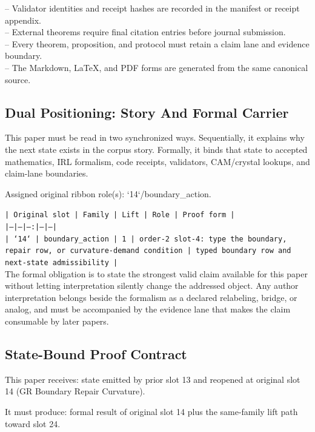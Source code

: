 \documentclass[11pt]{article}
\begin{document}
\noindent{}-- Validator identities and receipt hashes are recorded in the manifest or receipt appendix.\\
\noindent{}-- External theorems require final citation entries before journal submission.\\
\noindent{}-- Every theorem, proposition, and protocol must retain a claim lane and evidence boundary.\\
\noindent{}-- The Markdown, LaTeX, and PDF forms are generated from the same canonical source.\\

\subsection*{Dual Positioning: Story And Formal Carrier}

This paper must be read in two synchronized ways. Sequentially, it explains why
the next state exists in the corpus story. Formally, it binds that state to
accepted mathematics, IRL formalism, code receipts, validators, CAM/crystal
lookups, and claim-lane boundaries.

Assigned original ribbon role(s): `14`/boundary\_action.

\noindent\texttt{| Original slot | Family | Lift | Role | Proof form |}\\
\noindent\texttt{|---|---|---:|---|---|}\\
\noindent\texttt{| `14` | boundary\_action | 1 | order-2 slot-4: type the boundary, repair row, or curvature-demand condition | typed boundary row and next-state admissibility |}\\

The formal obligation is to state the strongest valid claim available for this
paper without letting interpretation silently change the addressed object. Any
author interpretation belongs beside the formalism as a declared relabeling,
bridge, or analog, and must be accompanied by the evidence lane that makes the
claim consumable by later papers.

\subsection*{State-Bound Proof Contract}

This paper receives: state emitted by prior slot 13 and reopened at original slot 14 (GR Boundary Repair Curvature).

It must produce: formal result of original slot 14 plus the same-family lift path toward slot 24.
\end{document}
